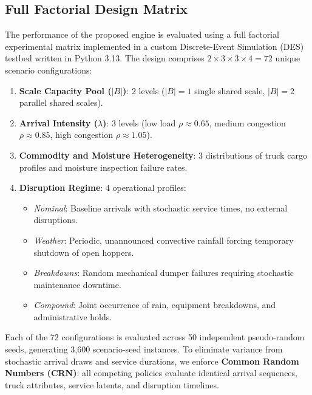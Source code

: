 \documentclass[11pt,a4paper]{article}
\begin{document}
\subsection{Full Factorial Design Matrix}
The performance of the proposed engine is evaluated using a full factorial experimental matrix implemented in a custom Discrete-Event Simulation (DES) testbed written in Python 3.13. The design comprises $2 \times 3 \times 3 \times 4 = 72$ unique scenario configurations:
\begin{enumerate}[leftmargin=1.2cm,itemsep=0pt,topsep=2pt]
  \item \textbf{Scale Capacity Pool ($|B|$)}: 2 levels ($|B|=1$ single shared scale, $|B|=2$ parallel shared scales).
  \item \textbf{Arrival Intensity ($\lambda$)}: 3 levels (low load $\rho \approx 0.65$, medium congestion $\rho \approx 0.85$, high congestion $\rho \approx 1.05$).
  \item \textbf{Commodity and Moisture Heterogeneity}: 3 distributions of truck cargo profiles and moisture inspection failure rates.
  \item \textbf{Disruption Regime}: 4 operational profiles:
    \begin{itemize}[leftmargin=0.8cm,itemsep=0pt]
      \item \emph{Nominal}: Baseline arrivals with stochastic service times, no external disruptions.
      \item \emph{Weather}: Periodic, unannounced convective rainfall forcing temporary shutdown of open hoppers.
      \item \emph{Breakdowns}: Random mechanical dumper failures requiring stochastic maintenance downtime.
      \item \emph{Compound}: Joint occurrence of rain, equipment breakdowns, and administrative holds.
    \end{itemize}
\end{enumerate}

Each of the 72 configurations is evaluated across 50 independent pseudo-random seeds, generating 3,600 scenario-seed instances. To eliminate variance from stochastic arrival draws and service durations, we enforce \textbf{Common Random Numbers (CRN)}: all competing policies evaluate identical arrival sequences, truck attributes, service latents, and disruption timelines.
\end{document}
